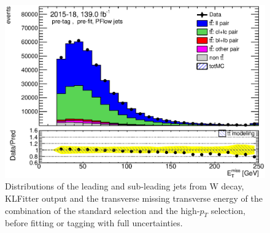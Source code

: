 \documentclass[letterpaper,12pt]{article}
\begin{document}
\begin{figure}
\begin{minipage}[b]{.45\textwidth}
	\end{minipage}\hfill
	\begin{minipage}[b]{.45\textwidth}
	\centering
	\includegraphics[width=1\textwidth]{Oct_distributions/pretagNoRwDL1rwithhighpTPFlow_scaledall/DataMC_MET.eps}
	\end{minipage}
	\caption{Distributions of the leading and sub-leading jets from W decay, KLFitter output and the 
	transverse missing transverse energy of the combination of the standard selection and the 
	high-$p_T$ selection, before fitting or tagging with full uncertainties.} \label{fig:jets_PFlow}
	\end{figure}
	
	
	
\end{document}
